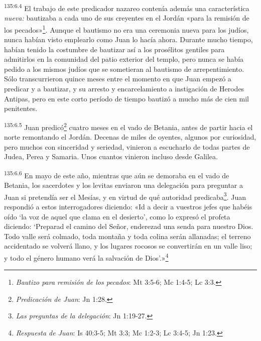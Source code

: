 \par 
\textsuperscript{135:6.4} El trabajo de este predicador nazareo contenía además una característica \textit{nueva:} bautizaba a cada uno de sus creyentes en el Jordán «para la remisión de los pecados»\footnote{\textit{Bautizo para remisión de los pecados}: Mt 3:5-6; Mc 1:4-5; Lc 3:3.}. Aunque el bautismo no era una ceremonia nueva para los judíos, nunca habían visto emplearlo como Juan lo hacía ahora. Durante mucho tiempo, habían tenido la costumbre de bautizar así a los prosélitos gentiles para admitirlos en la comunidad del patio exterior del templo, pero nunca se había pedido a los mismos judíos que se sometieran al bautismo de arrepentimiento. Sólo transcurrieron quince meses entre el momento en que Juan empezó a predicar y a bautizar, y su arresto y encarcelamiento a instigación de Herodes Antipas, pero en este corto período de tiempo bautizó a mucho más de cien mil penitentes.

\par 
\textsuperscript{135:6.5} Juan predicó\footnote{\textit{Predicación de Juan}: Jn 1:28.} cuatro meses en el vado de Betania, antes de partir hacia el norte remontando el Jordán. Decenas de miles de oyentes, algunos por curiosidad, pero muchos con sinceridad y seriedad, vinieron a escucharlo de todas partes de Judea, Perea y Samaria. Unos cuantos vinieron incluso desde Galilea.

\par 
\textsuperscript{135:6.6} En mayo de este año, mientras que aún se demoraba en el vado de Betania, los sacerdotes y los levitas enviaron una delegación para preguntar a Juan si pretendía ser el Mesías, y en virtud de qué autoridad predicaba\footnote{\textit{Las preguntas de la delegación}: Jn 1:19-27.}. Juan respondió a estos interrogadores diciendo: «Id a decir a vuestros jefes que habéis oído `la voz de aquel que clama en el desierto', como lo expresó el profeta diciendo: `Preparad el camino del Señor, enderezad una senda para nuestro Dios. Todo valle será colmado, toda montaña y toda colina serán allanadas; el terreno accidentado se volverá llano, y los lugares rocosos se convertirán en un valle liso; y todo el género humano verá la salvación de Dios'.»\footnote{\textit{Respuesta de Juan}: Is 40:3-5; Mt 3:3; Mc 1:2-3; Lc 3:4-5; Jn 1:23.}

